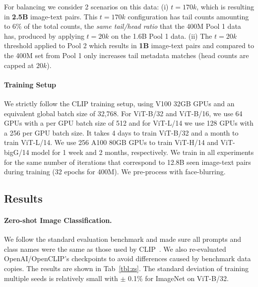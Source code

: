 \documentclass{article} %
\begin{document}
For balancing we consider 2 scenarios on this data: (i) $t=170k$, which is resulting in \textbf{2.5B} image-text pairs. This $t=170k$ configuration has tail counts amounting to 6\% of the total counts, the \textit{same tail/head ratio} that the 400M Pool 1 data has, produced by applying $t=20k$ on the 1.6B Pool 1 data. (ii) The $t=20k$ threshold applied to Pool 2 which results in \textbf{1B} image-text pairs and compared to the 400M set from Pool 1 only increases tail metadata matches (head counts are capped at $20k$). 


\paragraph{Training Setup}

We strictly follow the CLIP training setup, using V100 32GB GPUs and an equivalent global batch size of 32,768.
For ViT-B/32 and ViT-B/16, we use 64 GPUs with a per GPU batch size of 512 and for ViT-L/14 we use 128 GPUs with a 256 per GPU batch size.
It takes 4 days to train ViT-B/32 and a month to train ViT-L/14. We use 256 A100 80GB GPUs to train ViT-H/14 and ViT-bigG/14 model for 1 week and 2 months, respectively. We train in all experiments for the same number of iterations that correspond to 12.8B seen image-text pairs during training (32 epochs for 400M). We pre-process with face-blurring.

\subsection{Results}
\paragraph{Zero-shot Image Classification.}
We follow the standard evaluation benchmark and made sure all prompts and class names were the same as those used by CLIP~\cite{radford2021learning}. We also re-evaluated OpenAI/OpenCLIP's checkpoints to avoid differences caused by benchmark data copies.
The results are shown in Tab~\ref{tbl:zs}. {\color{black} The standard deviation of training multiple seeds is relatively small with $\pm$ 0.1\% for ImageNet on ViT-B/32.}
\end{document}
